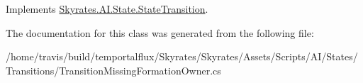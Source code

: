 Implements \hyperlink{class_skyrates_1_1_a_i_1_1_state_1_1_state_transition_a774f9f4ee740450b5b41f565f158be88}{Skyrates.\-A\-I.\-State.\-State\-Transition}.



The documentation for this class was generated from the following file\-:\begin{DoxyCompactItemize}
\item 
/home/travis/build/temportalflux/\-Skyrates/\-Skyrates/\-Assets/\-Scripts/\-A\-I/\-States/\-Transitions/Transition\-Missing\-Formation\-Owner.\-cs\end{DoxyCompactItemize}
